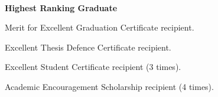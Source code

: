 \\
\begin{zitemize}
    \item \textbf{Highest Ranking Graduate}
    \item Merit for Excellent Graduation Certificate recipient.
    \item Excellent Thesis Defence Certificate recipient.
    \item Excellent Student Certificate recipient (3 times).
    \item Academic Encouragement Scholarship recipient (4 times).
\end{zitemize}


